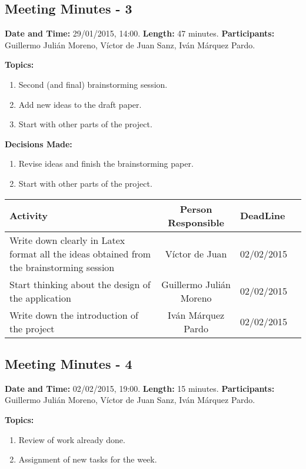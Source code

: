 \subsection{Meeting Minutes - 3}
\textbf{Date and Time:} 29/01/2015, 14:00. 
\textbf{Length:} 47 minutes. 
\textbf{Participants: } Guillermo Julián Moreno, Víctor de Juan Sanz, Iván Márquez Pardo.

\textbf{Topics: } 
\begin{enumerate}
\item Second (and final) brainstorming session.
\item Add new ideas to the draft paper.
\item Start with other parts of the project.
\end{enumerate}

\textbf{Decisions Made:}\\
\begin{enumerate}
\item Revise ideas and finish the brainstorming paper.
\item Start with other parts of the project.
\end{enumerate}

\begin{tabular}{|p{5cm} c|p{5cm}|p{5cm}|}
\hline Activity & Person Responsible & DeadLine \\\hline
Write down clearly in Latex format all the ideas obtained from the brainstorming session & Víctor de Juan & 02/02/2015\\\hline

Start thinking about the design of the application & Guillermo Julián Moreno & 02/02/2015\\\hline

Write down the introduction of the project & Iván Márquez Pardo & 02/02/2015\\\hline
\end{tabular}


\subsection{Meeting Minutes - 4}
\textbf{Date and Time:} 02/02/2015, 19:00. 
\textbf{Length:} 15 minutes. 
\textbf{Participants: } Guillermo Julián Moreno, Víctor de Juan Sanz, Iván Márquez Pardo.

\textbf{Topics: } 
\begin{enumerate}
\item Review of work already done.
\item Assignment of new tasks for the week.
\end{enumerate}

